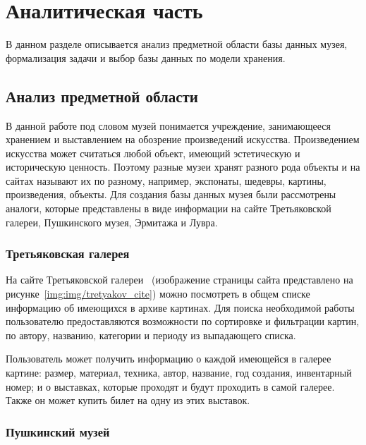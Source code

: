 \chapter{Аналитическая часть}

В данном разделе описывается анализ предметной области базы данных музея, формализация задачи и выбор базы данных по модели хранения.

\section{Анализ предметной области}


В данной работе под словом музей понимается учреждение, занимающееся хранением и выставлением на обозрение произведений искусства. Произведением искусства может считаться любой объект, имеющий эстетическую и историческую ценность. Поэтому разные музеи хранят разного рода объекты и на сайтах называют их по разному, например, экспонаты, шедевры, картины, произведения, объекты.
Для создания базы данных музея были рассмотрены аналоги, которые представлены в виде информации на сайте Третьяковской галереи, Пушкинского музея, Эрмитажа и Лувра.

\subsection{Третьяковская галерея}

На сайте Третьяковской галереи~\cite{tretyakovgallery} (изображение страницы сайта представлено на рисунке~\ref{img:img/tretyakov_cite}) можно посмотреть в общем списке информацию об имеющихся в архиве картинах. Для поиска необходимой работы пользователю предоставляются возможности по сортировке и фильтрации картин, по автору, названию, категории и периоду из выпадающего списка. 

Пользователь может получить информацию о каждой имеющейся в галерее картине: размер, материал, техника, автор, название, год создания, инвентарный номер; и о выставках, которые проходят и будут проходить в самой галерее. Также он может купить билет на одну из этих выставок.

\FloatBarrier
{}
\FloatBarrier



\subsection{Пушкинский музей}


